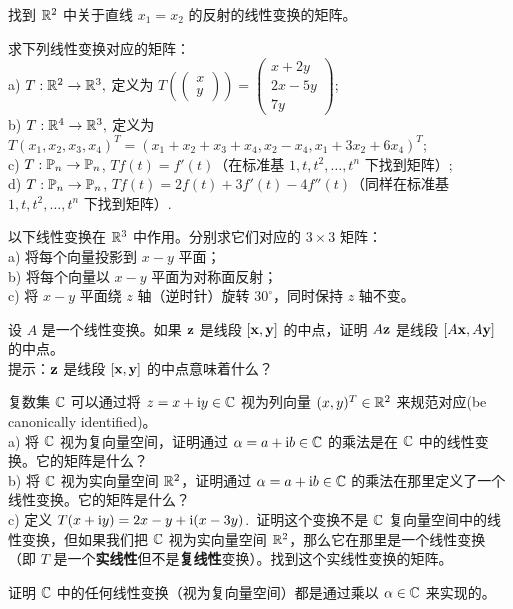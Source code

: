 \begin{problemset}
\item \label{ex:01-03-02} 找到 $\mathbb{R}^2$ 中关于直线 $x_1 = x_2$ 的反射的线性变换的矩阵。
\item \label{ex:01-03-03} 求下列线性变换对应的矩阵：
\\
a) $T: \mathbb{R}^2 \to \mathbb{R}^3,$ 定义为 $T(\begin{pmatrix} x \\ y \end{pmatrix}) = \begin{pmatrix} x + 2y \\ 2x - 5y \\ 7y \end{pmatrix}$;
\\
b) $T: \mathbb{R}^4 \to \mathbb{R}^3,$ 定义为 $T(x_1, x_2, x_3, x_4)^T = (x_1 + x_2 + x_3 + x_4, x_2 - x_4, x_1 + 3x_2 + 6x_4)^T$;
\\
c) $T: \mathbb{P}_n \to \mathbb{P}_n$, $T f(t) = f'(t)$（在标准基 $1, t, t^2, \dots, t^n$ 下找到矩阵）;
\\
d) $T: \mathbb{P}_n \to \mathbb{P}_n$, $T f(t) = 2 f(t) + 3 f'(t) - 4 f''(t)$（同样在标准基 $1, t, t^2, \dots, t^n$ 下找到矩阵）.
\item \label{ex:01-03-04} 以下线性变换在 $\mathbb{R}^3$ 中作用。分别求它们对应的 $3 \times 3$ 矩阵：
\\
a) 将每个向量投影到 $x-y$ 平面；
\\
b) 将每个向量以 $x-y$ 平面为对称面反射；
\\
c) 将 $x-y$ 平面绕 $z$ 轴（逆时针）旋转 $30^\circ$，同时保持 $z$ 轴不变。
\item \label{ex:01-03-05} 设 $A$ 是一个线性变换。如果 $\mathbf{z}$ 是线段 $[\mathbf{x}, \mathbf{y}]$ 的中点，证明 $A \mathbf{z}$ 是线段 $[A \mathbf{x}, A \mathbf{y}]$ 的中点。
\\
{\heiti 提示}：$\mathbf{z}$ 是线段 $[\mathbf{x}, \mathbf{y}]$ 的中点意味着什么？
\item \label{ex:01-03-06} 复数集 $\mathbb{C}$ 可以通过将 $z = x + {\rm i}  y \in \mathbb{C}$ 视为列向量 $(x, y)^T \in \mathbb{R}^2$ 来规范对应(be canonically identified)。
\\
a) 将 $\mathbb{C}$ 视为复向量空间，证明通过 $\alpha = a + {\rm i} b \in \mathbb{C}$ 的乘法是在 $\mathbb{C}$ 中的线性变换。它的矩阵是什么？
\\
b) 将 $\mathbb{C}$ 视为实向量空间 $\mathbb{R}^2$，证明通过 $\alpha = a + {\rm i} b \in \mathbb{C}$ 的乘法在那里定义了一个线性变换。它的矩阵是什么？
\\
c) 定义 $T(x + {\rm i} y) = 2x - y + {\rm i} (x - 3y)$.~证明这个变换不是 $\mathbb{C}$ 复向量空间中的线性变换，但如果我们把 $\mathbb{C}$ 视为实向量空间 $\mathbb{R}^2$，那么它在那里是一个线性变换（即 $T$ 是一个\textbf{实线性}但不是\textbf{复线性}变换）。找到这个实线性变换的矩阵。
\item \label{ex:01-03-07} 证明 $\mathbb{C}$ 中的任何线性变换（视为复向量空间）都是通过乘以 $\alpha \in \mathbb{C}$ 来实现的。

\end{problemset}

